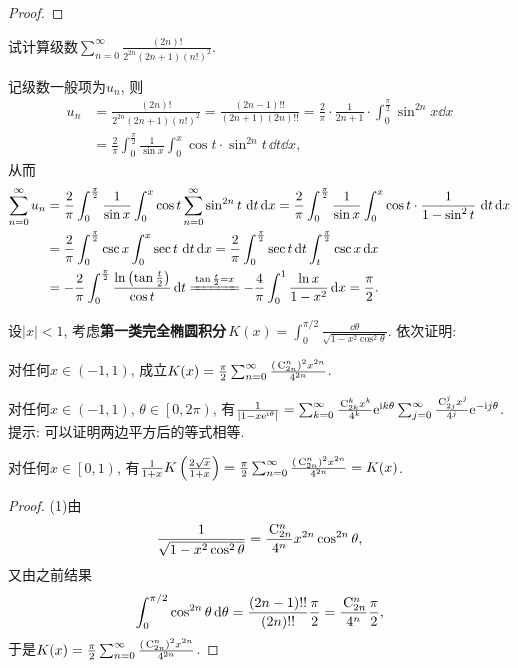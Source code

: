 \begin{quizb}
\begin{proof}
\end{proof}
\woe 试计算级数\(\sum_{n=0}^{\infty}\frac{(2n)!}{2^{2n}(2n+1)(n!)^2}.\)
\begin{solution}
记级数一般项为\(u_n\), 则
\[\begin{split}
u_n&=\frac{(2n)!}{2^{2n}(2n+1)(n!)^2}=\frac{(2n-1)!!}{(2n+1)(2n)!!}=\frac{2}{\pi}\cdot\frac{1}{2n+1}\cdot\int_{0}^{\frac{\pi}{2}}\sin^{2n}x\dd x\\&=\frac{2}{\pi}\int_{0}^{\frac{\pi}{2}}\frac{1}{\sin x}\int_{0}^{x}\cos t\cdot\sin^{2n}t\,\dd t\dd x,
\end{split}\]从而\[\begin{split}
\sum_{n=0}^{\infty}u_n&=\frac{2}{\pi}\int_{0}^{\frac{\pi}{2}}\frac{1}{\sin x}\int_{0}^{x}\cos t\sum_{n=0}^{\infty}\sin^{2n}t\,\dd t\dd x=\frac{2}{\pi}\int_{0}^{\frac{\pi}{2}}\frac{1}{\sin x}\int_{0}^{x}\cos t\cdot\frac{1}{1-\sin^2 t}\,\dd t\dd x\\&=\frac{2}{\pi}\int_{0}^{\frac{\pi}{2}}\csc x\int_{0}^{x}\sec t\,\dd t\dd x=\frac{2}{\pi}\int_{0}^{\frac{\pi}{2}}\sec t\dd t\int_{t}^{\frac{\pi}{2}}\csc x\dd x\\&=-\frac{2}{\pi}\int_{0}^{\frac{\pi}{2}}\frac{\ln\left(\tan\frac{t}{2}\right)}{\cos t}\dd t\xlongequal{\tan\frac{t}{2}=x}-\frac{4}{\pi}\int_{0}^{1}\frac{\ln x}{1-x^2}\dd x=\frac{\pi}{2}.\qedhere\end{split}\]
\end{solution}
\woe 设\(|x|<1\), 考虑\textbf{第一类完全椭圆积分}\(\, K(x)=\int_{0}^{\pi/2}\frac{\dd\theta}{\sqrt{1-x^2\cos^2\theta}}\). 依次证明:
\begin{quizs}
\item 对任何\(x\in(-1,1)\), 成立\(K(x)=\frac{\pi}{2}\sum_{n=0}^{\infty}\frac{\left(\,\mathrm{C}_{2n}^{n}\right)^2x^{2n}}{4^{2n}}\).
\item 对任何\(x\in(-1,1),\,\theta\in\left[0,2\pi\right)\), 有\(\frac{1}{|1-x\mathrm{e}^{\mathrm{i}\theta}|}=\sum_{k=0}^{\infty}\frac{\,\mathrm{C}_{2k}^kx^k}{4^k}\mathrm{e}^{\mathrm{i}k\theta}\sum_{j=0}^{\infty}\frac{\,\mathrm{C}_{2j}^jx^j}{4^j}\mathrm{e}^{-\mathrm{i}j\theta}\).\\提示: 可以证明两边平方后的等式相等.
\item 对任何\(x\in\left[0,1\right)\), 有\(\frac{1}{1+x}K\left(\frac{2\sqrt{x}}{1+x}\right)=\frac{\pi}{2}\sum_{n=0}^{\infty}\frac{\left(\,\mathrm{C}_{2n}^n\right)^2x^{2n}}{4^{2n}}=K(x)\).
\end{quizs}
\begin{proof}
(1)由\[\frac{1}{\sqrt{1-x^2\cos^2\theta}}=\frac{\,\mathrm{C}_{2n}^n}{4^n}x^{2n}\cos^{2n}\theta,\]又由之前结果\[\int_{0}^{\pi/2}\cos^{2n}\theta\,\mathrm{d} \theta=\frac{(2n-1)!!}{(2n)!!}\frac{\pi}{2}=\frac{\,\mathrm{C}^{n}_{2n}}{4^n}\frac{\pi}{2},\]于是\(K(x)=\frac{\pi}{2}\sum_{n=0}^{\infty}\frac{\left(\,\mathrm{C}_{2n}^{n}\right)^2x^{2n}}{4^{2n}}\).


\end{proof}
\end{quizb}

